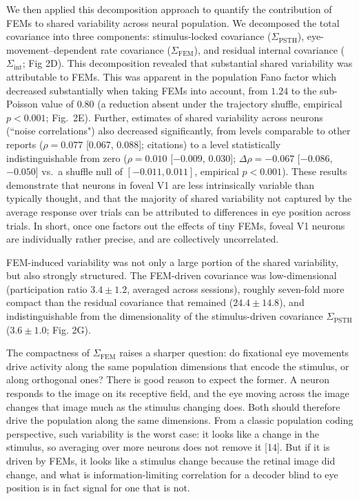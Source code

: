 \documentclass{lite}
\newcommand{\Cpsth}{\Sigma_{\text{PSTH}}}
\newcommand{\Cfem}{\Sigma_{\text{FEM}}}
\begin{document}
We then applied this decomposition approach to quantify the contribution of FEMs to shared variability across neural population. 
We decomposed the total covariance into three components: stimulus-locked covariance ($\Cpsth$), eye-movement--dependent rate covariance ($\Cfem$), and residual internal covariance ($\Sigma_{\text{int}}$; Fig 2D). This decomposition revealed that substantial shared variability was attributable to FEMs. This was apparent in the population Fano factor
which decreased substantially when taking FEMs into account, from $1.24$ to the sub-Poisson value of $0.80$ (a reduction absent under the trajectory shuffle, empirical $p<0.001$; Fig.~2E). Further, estimates of shared variability across neurons (``noise correlations") also decreased significantly, from levels comparable to other reports ($\rho = 0.077$ [$0.067$, $0.088$]; citations) to a level statistically indistinguishable from zero ($\rho = 0.010$ [$-0.009$, $0.030$]; $\Delta \rho = -0.067$ [$-0.086$, $-0.050$] vs.\ a shuffle null of $[-0.011, 0.011]$, empirical $p<0.001$). These results demonstrate that neurons in foveal V1 are less intrinsically variable than typically thought, and that the majority of shared variability not captured by the average response over trials can be attributed to differences in eye position across trials. In short, once one factors out the effects of tiny FEMs, foveal V1 neurons are individually rather precise, and are collectively uncorrelated. 

FEM-induced variability was not only a large portion of the shared variability, but also strongly structured. The FEM-driven covariance was low-dimensional (participation ratio $3.4 \pm 1.2$, averaged across sessions), roughly seven-fold more compact than the residual covariance that remained ($24.4 \pm 14.8$), and indistinguishable from the dimensionality of the stimulus-driven covariance $\Cpsth$ ($3.6 \pm 1.0$; Fig. 2G). 

The compactness of $\Cfem$ raises a sharper question: do fixational eye movements drive activity along the same population dimensions that encode the stimulus, or along orthogonal ones? There is good reason to expect the former. A neuron responds to the image on its receptive field, and the eye moving across the image changes that image much as the stimulus changing does. Both should therefore drive the population along the same dimensions. From a classic population coding perspective, such variability is the worst case: it looks like a change in the stimulus, so averaging over more neurons does not remove it [14]. But if it is driven by FEMs, it looks like a stimulus change because the retinal image did change, and what is information-limiting correlation for a decoder blind to eye position is in fact signal for one that is not.
\end{document}
